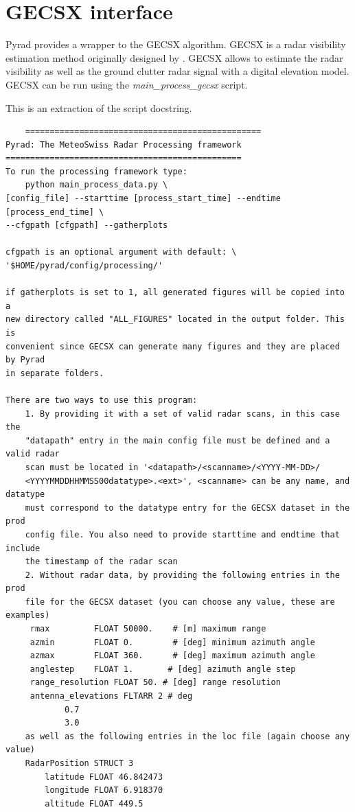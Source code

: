 \documentclass[a4paper,11pt,pdftex,twoside]{scrartcl}
\begin{document}
{{{\newpage

\section{GECSX interface}

Pyrad provides a wrapper to the GECSX algorithm. GECSX is a radar visibility estimation method originally designed by \citep{Gabella_JAOT_1998}. 
GECSX allows to estimate the radar visibility as well as the ground clutter radar signal with a digital elevation model. GECSX can be run using the \textit{main\_process\_gecsx} script.

This is an extraction of the script docstring.
\begin{verbatim}
    ================================================
Pyrad: The MeteoSwiss Radar Processing framework
================================================
To run the processing framework type:
    python main_process_data.py \
[config_file] --starttime [process_start_time] --endtime [process_end_time] \
--cfgpath [cfgpath] --gatherplots

cfgpath is an optional argument with default: \
'$HOME/pyrad/config/processing/'

if gatherplots is set to 1, all generated figures will be copied into a
new directory called "ALL_FIGURES" located in the output folder. This is
convenient since GECSX can generate many figures and they are placed by Pyrad
in separate folders.

There are two ways to use this program:
    1. By providing it with a set of valid radar scans, in this case the
    "datapath" entry in the main config file must be defined and a valid radar
    scan must be located in '<datapath>/<scanname>/<YYYY-MM-DD>/
    <YYYYMMDDHHMMSS00datatype>.<ext>', <scanname> can be any name, and datatype
    must correspond to the datatype entry for the GECSX dataset in the prod
    config file. You also need to provide starttime and endtime that include
    the timestamp of the radar scan
    2. Without radar data, by providing the following entries in the prod
    file for the GECSX dataset (you can choose any value, these are examples)
     rmax         FLOAT 50000.    # [m] maximum range
     azmin        FLOAT 0.        # [deg] minimum azimuth angle
     azmax        FLOAT 360.      # [deg] maximum azimuth angle
     anglestep    FLOAT 1.       # [deg] azimuth angle step
     range_resolution FLOAT 50. # [deg] range resolution
     antenna_elevations FLTARR 2 # deg
            0.7
            3.0
    as well as the following entries in the loc file (again choose any value)
    RadarPosition STRUCT 3
        latitude FLOAT 46.842473
        longitude FLOAT 6.918370
        altitude FLOAT 449.5


\end{verbatim}}}}
\end{document}
